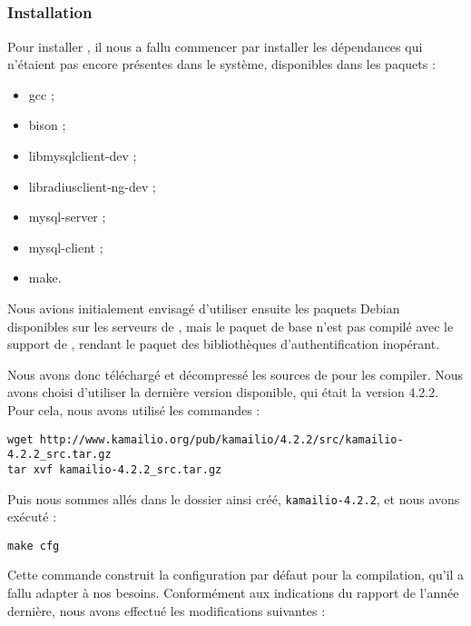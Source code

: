\subsection{\kam}

\subsubsection{Installation}

Pour installer {\kam}, il nous a fallu commencer par installer les dépendances qui n’étaient pas encore présentes dans le système, disponibles dans les paquets :

\begin{itemize}
	\item{gcc} ;
	\item{bison} ;
	\item{libmysqlclient-dev} ;
	\item{libradiusclient-ng-dev} ;
	\item{mysql-server} ;
	\item{mysql-client} ;
	\item{make}.
\end{itemize}

Nous avions initialement envisagé d’utiliser ensuite les paquets Debian disponibles sur les serveurs de {\kam}, mais le paquet de base n’est pas compilé avec le support de {\rad}, rendant le paquet des bibliothèques d’authentification {\rad} inopérant.

Nous avons donc téléchargé et décompressé les sources de {\kam} pour les compiler. Nous avons choisi d’utiliser la dernière version disponible, qui était la version 4.2.2. Pour cela, nous avons utilisé les commandes :

\begin{verbatim}
wget http://www.kamailio.org/pub/kamailio/4.2.2/src/kamailio-4.2.2_src.tar.gz
tar xvf kamailio-4.2.2_src.tar.gz
\end{verbatim}

Puis nous sommes allés dans le dossier ainsi créé, \texttt{kamailio-4.2.2}, et nous avons exécuté :

\begin{verbatim}
make cfg
\end{verbatim}

Cette commande construit la configuration par défaut pour la compilation, qu’il a fallu adapter à nos besoins. Conformément aux indications du rapport de l’année dernière, nous avons effectué les modifications suivantes :

